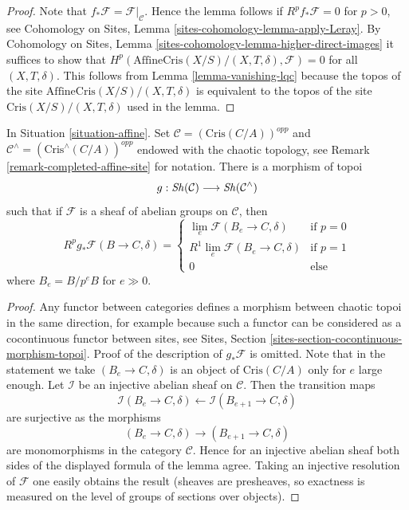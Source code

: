 \begin{proof}
\medskip\noindent
Note that $f_*\mathcal{F} = \mathcal{F}|_\mathcal{C}$. Hence the lemma
follows if $R^pf_*\mathcal{F} = 0$ for $p > 0$, see
Cohomology on Sites, Lemma \ref{sites-cohomology-lemma-apply-Leray}. By
Cohomology on Sites, Lemma \ref{sites-cohomology-lemma-higher-direct-images}
it suffices to show that
$H^p(\text{AffineCris}(X/S)/(X, T, \delta), \mathcal{F}) = 0$
for all $(X, T, \delta)$.
This follows from Lemma \ref{lemma-vanishing-lqc} because the
topos of the site $\text{AffineCris}(X/S)/(X, T, \delta)$
is equivalent to the topos of the site
$\text{Cris}(X/S)/(X, T, \delta)$ used in the lemma.
\end{proof}

\begin{lemma}
\label{lemma-complete}
In Situation \ref{situation-affine}.
Set $\mathcal{C} = (\text{Cris}(C/A))^{opp}$ and
$\mathcal{C}^\wedge = (\text{Cris}^\wedge(C/A))^{opp}$
endowed with the chaotic topology, see
Remark \ref{remark-completed-affine-site} for notation.
There is a morphism of topoi
$$
g : \mathop{\mathit{Sh}}\nolimits(\mathcal{C}) \longrightarrow \mathop{\mathit{Sh}}\nolimits(\mathcal{C}^\wedge)
$$
such that if $\mathcal{F}$ is a sheaf of abelian groups on
$\mathcal{C}$, then
$$
R^pg_*\mathcal{F}(B \to C, \delta) =
\left\{
\begin{matrix}
\lim_e \mathcal{F}(B_e \to C, \delta) & \text{if }p = 0 \\
R^1\lim_e \mathcal{F}(B_e \to C, \delta) & \text{if }p = 1 \\
0 & \text{else}
\end{matrix}
\right.
$$
where $B_e = B/p^eB$ for $e \gg 0$.
\end{lemma}

\begin{proof}
Any functor between categories defines a morphism between chaotic
topoi in the same direction, for example because such a functor
can be considered as a cocontinuous functor between sites, see
Sites, Section \ref{sites-section-cocontinuous-morphism-topoi}.
Proof of the description of $g_*\mathcal{F}$ is omitted.
Note that in the statement we take $(B_e \to C, \delta)$
is an object of $\text{Cris}(C/A)$  only for $e$ large enough.
Let $\mathcal{I}$ be an injective abelian sheaf on $\mathcal{C}$.
Then the transition maps
$$
\mathcal{I}(B_e \to C, \delta) \leftarrow
\mathcal{I}(B_{e + 1} \to C, \delta)
$$
are surjective as the morphisms
$$
(B_e \to C, \delta)
\longrightarrow
(B_{e + 1} \to C, \delta)
$$
are monomorphisms in the category $\mathcal{C}$. Hence for an injective
abelian sheaf both sides of the displayed formula of the lemma agree.
Taking an injective resolution of $\mathcal{F}$ one easily obtains
the result (sheaves are presheaves, so exactness is measured on the
level of groups of sections over objects).
\end{proof}

